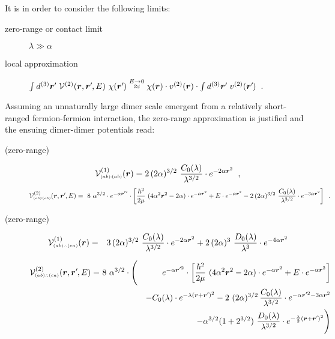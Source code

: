 \documentclass[onecolumn,preprint,superscriptaddress,nofootinbib,notitlepage,10pt,linenumbers]{revtex4-1}
\newcommand*{\mprime}{^{\prime}\mkern-1.2mu}
\newcommand{\la}{\label}
\newcommand{\be}{\begin{equation}}
\newcommand{\ee}{\end{equation}}
\newcommand{\ve}[1]{\ensuremath{\boldsymbol{#1}}}
\newcommand{\abab}{\ensuremath $(ab)\!\!:\!\!(ab)$}
\newcommand{\abca}{\ensuremath $(ab)\wasytherefore(ca)$}
\begin{document}
It is in order to consider the following limits: 
\begin{description}
\item[zero-range or contact limit]$\lambda\gg\alpha$
\item[local approximation]
$\int d^{(3)}\ve{r}\mprime~\mathcal{V}^{(2)}(\ve{r},\ve{r}\mprime,E)~\chi(\ve{r}\mprime)\stackrel{E\to 0}{\approx}
\chi(\ve{r})\cdot v^{(2)}(\ve{r})\cdot\int d^{(3)}\ve{r}\mprime~v^{(2)}(\ve{r}\mprime)$~.
\end{description}

Assuming an unnaturally large dimer scale emergent from a relatively short-ranged fermion-fermion interaction,
the zero-range approximation is justified and the ensuing dimer-dimer potentials read:

\begin{description}
	\item[(zero-range)~\abab]
\be\la{eq.local.abab}
\mathcal{V}^{(1)}_{\text{\tiny\abab}}(\ve{r})=
2\,(2\alpha)^{3/2}~\frac{C_0(\lambda)}{\lambda^{3/2}}\cdot
 e^{-2\alpha\ve{r}^2}\;\;,
\ee
\be\la{eq.nonlocal.abab}
\mathcal{V}^{(2)}_{\text{\tiny\abab}}(\ve{r},\ve{r}\mprime,E)=
~8~\alpha^{3/2}\cdot e^{-\alpha\ve{r}\mprime^2}\cdot
\left[\frac{\hbar^2}{2\mu}~(4\alpha^2\ve{r}^2-2\alpha)
\cdot e^{-\alpha\ve{r}^2}+
E\cdot e^{-\alpha\ve{r}^2}
-2\,(2\alpha)^{3/2}~\frac{C_0(\lambda)}{\lambda^{3/2}}\cdot
 e^{-3\alpha\ve{r}^2}\right]\;\;.
\ee

\item[(zero-range)~\abca]
\begin{eqnarray}\la{eq.local.abca}
\mathcal{V}^{(1)}_{\text{\tiny\abca}}(\ve{r})&=&
3\,(2\alpha)^{3/2}~\frac{C_0(\lambda)}{\lambda^{3/2}}\cdot
 e^{-2\alpha\ve{r}^2}
 +2\,(2\alpha)^{3}~\frac{D_0(\lambda)}{\lambda^{3}}\cdot
 e^{-4\alpha\ve{r}^2}
\end{eqnarray}


\begin{eqnarray}\la{eq.nonlocal.abca}
\mathcal{V}^{(2)}_{\text{\tiny\abca}}(\ve{r},\ve{r}\mprime,E)=&~8~\alpha^{3/2}\cdot\Bigg(&e^{-\alpha\ve{r}\mprime^2}\cdot
\left[\frac{\hbar^2}{2\mu}~(4\alpha^2\ve{r}^2-2\alpha)
\cdot e^{-\alpha\ve{r}^2}+
E\cdot e^{-\alpha\ve{r}^2}\right]\\
&&-C_0(\lambda)\cdot
 e^{-\lambda(\ve{r}+\ve{r}\mprime)^2}
-2~(2\alpha)^{3/2}\,\frac{C_0(\lambda)}{\lambda^{3/2}}\cdot
 e^{-\alpha\ve{r}\mprime^2-3\alpha\ve{r}^2}\\
 &&-\alpha^{3/2}(1+2^{3/2})~\frac{D_0(\lambda)}{\lambda^{3/2}}\cdot
 e^{-\frac{\lambda}{2}(\ve{r}+\ve{r}\mprime)^2}\Bigg)
\end{eqnarray}

\end{description}



\end{document}
